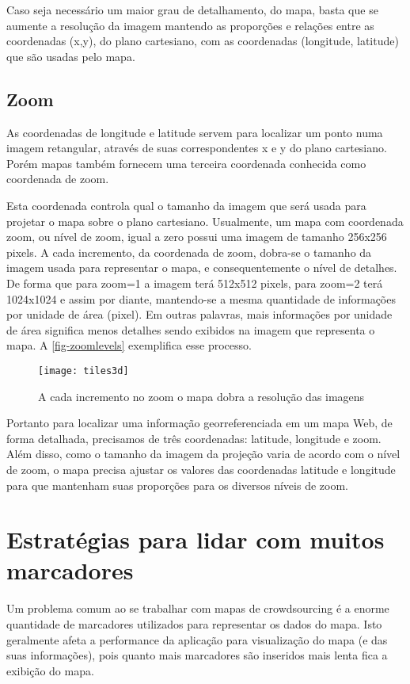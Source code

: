 	Caso seja necessário um maior grau de detalhamento, do mapa, basta que se aumente a resolução da imagem mantendo as proporções e relações entre as coordenadas (x,y), do plano cartesiano, com as coordenadas (longitude, latitude) que são usadas pelo mapa.
		
	\subsection{Zoom}
	As coordenadas de longitude e latitude servem para localizar um ponto numa imagem retangular, através de suas correspondentes x e y do plano cartesiano. Porém mapas também fornecem uma terceira coordenada conhecida como coordenada de zoom.
	
	 Esta  coordenada controla qual o tamanho da imagem que será usada para projetar o mapa sobre o plano cartesiano. Usualmente, um mapa com coordenada zoom, ou nível de zoom, igual a zero possui uma imagem de tamanho 256x256 pixels. A cada incremento, da coordenada de zoom, dobra-se o tamanho da imagem usada para representar o mapa, e consequentemente o nível de detalhes. De forma que  para zoom=1 a imagem terá 512x512 pixels, para zoom=2 terá 1024x1024 e assim por diante, mantendo-se a mesma quantidade de informações por unidade de área (pixel). Em outras palavras, mais informações por unidade de área significa menos detalhes sendo exibidos na imagem que representa o mapa. A \autoref{fig-zoomlevels} exemplifica esse processo.
	 
	\begin{figure}[htb]
	\caption{\label{fig-zoomlevels} A cada incremento no zoom o mapa dobra a resolução das imagens}
	\begin{center}
	    \texttt{[image: tiles3d]}
	\end{center}
	\end{figure}

	Portanto para localizar uma informação georreferenciada em um mapa Web, de forma detalhada, precisamos de três coordenadas: latitude, longitude e zoom. Além disso, como o tamanho da imagem da projeção varia de acordo com o nível de zoom, o mapa precisa ajustar os valores das coordenadas latitude e longitude para que mantenham suas proporções para os diversos níveis de zoom.

\section{Estratégias para lidar com muitos marcadores\label{sec-estrategias}}
	Um problema comum ao se trabalhar com mapas de crowdsourcing é a enorme quantidade de marcadores utilizados para representar os dados do mapa. Isto geralmente afeta a performance da aplicação para visualização do mapa (e das suas informações), pois quanto mais marcadores são inseridos mais lenta fica a exibição do mapa. 
	
